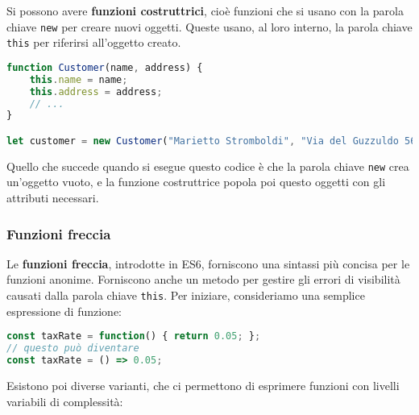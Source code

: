 \documentclass[a4paper,11pt]{article}
\begin{document}
Si possono avere \textbf{funzioni costruttrici}, cioè funzioni che si usano con la parola chiave \lstinline|new| per creare nuovi oggetti.
Queste usano, al loro interno, la parola chiave \lstinline|this| per riferirsi all'oggetto creato.

\begin{lstlisting}[language=javascript, style=codestyle]	
function Customer(name, address) {
	this.name = name;
	this.address = address;
	// ...
}

let customer = new Customer("Marietto Stromboldi", "Via del Guzzuldo 56");
\end{lstlisting}

Quello che succede quando si esegue questo codice è che la parola chiave \lstinline|new| crea un'oggetto vuoto, e la funzione costruttrice popola poi questo oggetti con gli attributi necessari.

\subsubsection{Funzioni freccia}
Le \textbf{funzioni freccia}, introdotte in ES6, forniscono una sintassi più concisa per le funzioni anonime.
Forniscono anche un metodo per gestire gli errori di visibilità causati dalla parola chiave \lstinline|this|.
Per iniziare, consideriamo una semplice espressione di funzione:
\begin{lstlisting}[language=javascript, style=codestyle]	
const taxRate = function() { return 0.05; };
// questo può diventare
const taxRate = () => 0.05;
\end{lstlisting}

Esistono poi diverse varianti, che ci permettono di esprimere funzioni con livelli variabili di complessità:
\end{document}
